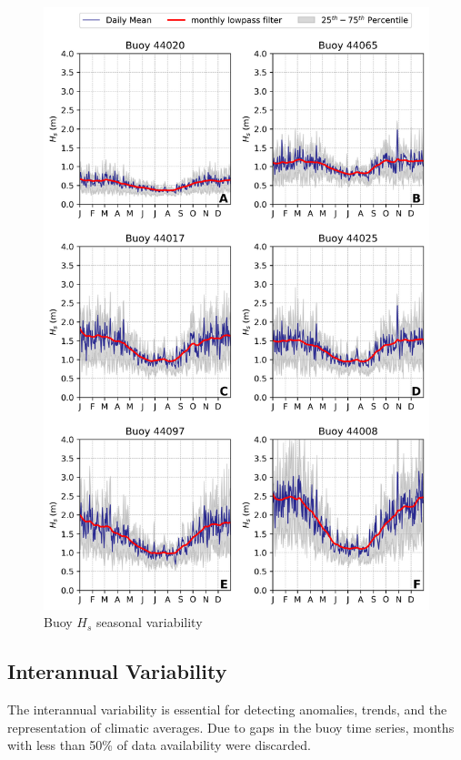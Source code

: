 \begin{figure}[H]
\centering
\includegraphics[width=0.95\linewidth]{Figures/Chapter5/buoys_wave_seasonal_qt1.png}
\caption{Buoy $H_{s}$ seasonal variability}
\label{fig:buoy_wave_seasonality}
\end{figure}



\subsection{Interannual Variability}

The interannual variability is essential for detecting anomalies, trends, and the representation of climatic averages. Due to gaps in the buoy time series, months with less than 50\% of data availability were discarded. 



